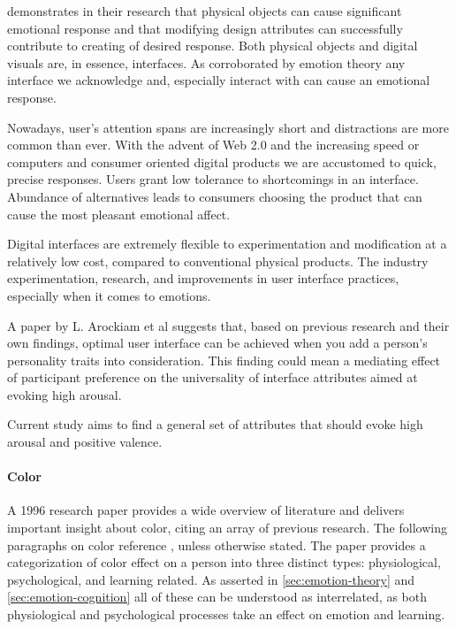 		\cite{Desmet2007} demonstrates in their research that physical objects can cause significant emotional response and that modifying design attributes can successfully contribute to creating of desired response.
		Both physical objects and digital visuals are, in essence, interfaces. As corroborated by emotion theory any interface we acknowledge and, especially interact with can cause an emotional response. 
		
		Nowadays, user's attention spans are increasingly short and distractions are more common than ever. With the advent of Web 2.0 and the increasing speed or computers and consumer oriented digital products we are accustomed to quick, precise responses. Users grant low tolerance to shortcomings in an interface. Abundance of alternatives leads to consumers choosing the product that can cause the most pleasant emotional affect.
		
 		Digital interfaces are extremely flexible to experimentation and modification at a relatively low cost, compared to conventional physical products.
 		The industry  experimentation, research, and improvements in user interface practices, especially when it comes to emotions.
		
		
		
		A paper by L. Arockiam et al \cite{Arockiam2013} suggests that, based on previous research and their own findings, optimal user interface can be achieved when you add a person's personality traits into consideration. This finding could mean a mediating effect of participant preference on the universality of interface attributes aimed at evoking high arousal. 
		
		Current study aims to find a general set of attributes that should evoke high arousal and positive valence.
		
		\paragraph{Color}
		
		A 1996 research paper \cite{Pert1996} provides a wide overview of literature and delivers important insight about color, citing an array of previous research. The following paragraphs on color reference \cite{Pert1996}, unless otherwise stated. The paper provides a categorization of color effect on a person into three distinct types: physiological, psychological, and learning related. As asserted in \ref{sec:emotion-theory} and \ref{sec:emotion-cognition} all of these can be understood as interrelated, as both physiological and psychological processes take an effect on emotion and learning.
						
